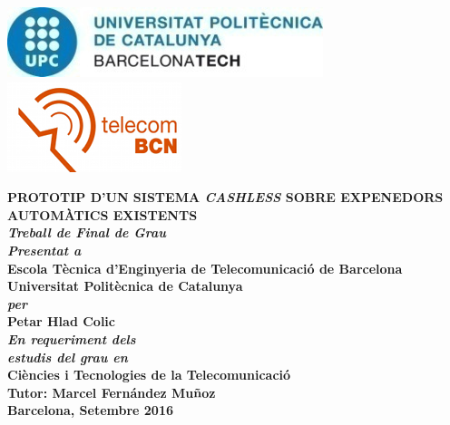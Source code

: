 \documentclass[12pt,a4paper,twoside,openright]{book}
\begin{document}
\newcommand{\titol}{Prototip d'un sistema \textit{cashless} sobre expenedors automàtics existents}
\newcommand{\shortitol}{Prototim d'un sistema cashless}
\newcommand{\autor}{Petar Hlad Colic}
\renewcommand{\cleardoublepage}{}

\frontmatter
\begin{titlepage}
   	\includegraphics[scale=1]{images/logoUPC.jpg}
   	\hfill
   	\includegraphics[scale=1]{images/logoETSETB.jpg}\\

   	\begin{center}
   	\vspace{1em}
   	\LARGE\textbf{\MakeUppercase{\titol}} \\
   	\vspace{2em}
   	\large\textit{\textbf{Treball de Final de Grau}}\\
   	\large\textit{\textbf{Presentat a}}\\
   	\vspace{0.5em}
   	\Large\textbf{Escola Tècnica d'Enginyeria de Telecomunicació de Barcelona}\\
   	\vspace{0.5em}
   	\Large\textbf{Universitat Politècnica de Catalunya}\\
   	\vspace{1em}
   	\large\textit{\textbf{per}}\\
   	\LARGE\textbf{\autor}\\
   	\vspace{2em}
   	\large\textit{\textbf{En requeriment dels}}\\
   	\large\textit{\textbf{estudis del grau en}}\\
   	\vspace{0.5em}
   	\Large\textbf{Ciències i Tecnologies de la Telecomunicació}\\
   	\vspace{4em}
   	\Large\textbf{Tutor: Marcel Fernández Muñoz}\\
   	\vspace{3em}
   	\large\textbf{Barcelona, Setembre 2016}\\
   	\end{center}
\end{titlepage} 
\newpage\null\thispagestyle{empty}\newpage
\newpage{\cleardoublepage}

\newpage{\cleardoublepage}
\end{document}
